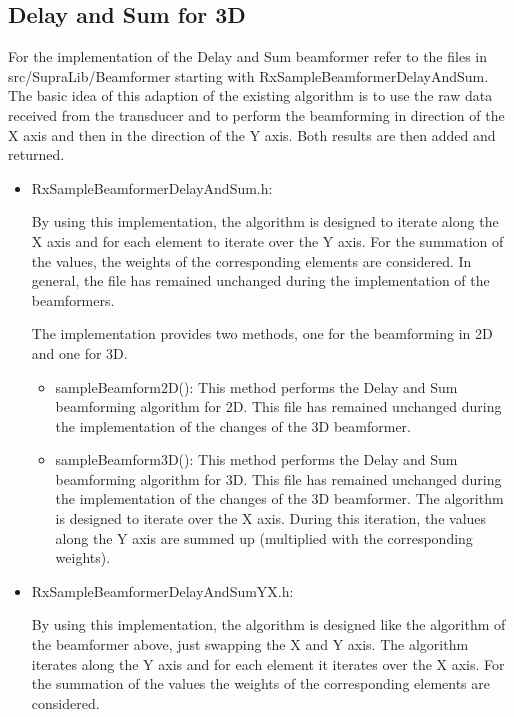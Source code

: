 \documentclass[12pt,a4paper,oneside]{scrartcl}
\begin{document}
\subsection{Delay and Sum for 3D}
For the implementation of the Delay and Sum beamformer refer to the files in src/SupraLib/Beamformer starting with RxSampleBeamformerDelayAndSum.
The basic idea of this adaption of the existing algorithm is to use the raw data received from the transducer and to perform the beamforming in direction of the X axis and then in the direction of the Y axis.
Both results are then added and returned.
\begin{itemize}
  \item RxSampleBeamformerDelayAndSum.h:

    By using this implementation, the algorithm is designed to iterate along the X axis and for each element to iterate over the Y axis.
    For the summation of the values, the weights of the corresponding elements are considered.
    In general, the file has remained unchanged during the implementation of the beamformers.

    The implementation provides two methods, one for the beamforming in 2D and one for 3D.
      \begin{itemize}
        \item sampleBeamform2D():
          This method performs the Delay and Sum beamforming algorithm for 2D.
          This file has remained unchanged during the implementation of the changes of the 3D beamformer.
        \item sampleBeamform3D():
          This method performs the Delay and Sum beamforming algorithm for 3D.
          This file has remained unchanged during the implementation of the changes of the 3D beamformer.
          The algorithm is designed to iterate over the X axis.
          During this iteration, the values along the Y axis are summed up (multiplied with the corresponding weights).
      \end{itemize}

  \item RxSampleBeamformerDelayAndSumYX.h:

    By using this implementation, the algorithm is designed like the algorithm of the beamformer above, just swapping the X and Y axis.
    The algorithm iterates along the Y axis and for each element it iterates over the X axis.
    For the summation of the values the weights of the corresponding elements are considered.


\end{itemize}
\end{document}

